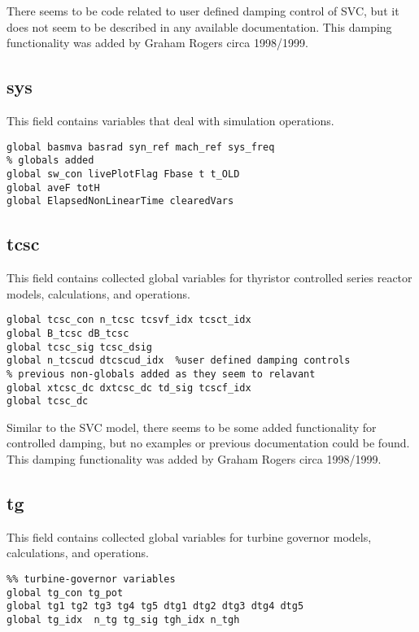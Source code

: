 There seems to be code related to user defined damping control of SVC, but it does not seem to be described in any available documentation. 
This damping functionality was added by Graham Rogers circa 1998/1999.


\subsection{sys}
This field contains variables that deal with simulation operations.
\begin{verbatim}
global basmva basrad syn_ref mach_ref sys_freq
% globals added
global sw_con livePlotFlag Fbase t t_OLD
global aveF totH
global ElapsedNonLinearTime clearedVars
\end{verbatim}

\subsection{tcsc}
This field contains collected global variables for thyristor controlled series reactor models, calculations, and operations.
\begin{verbatim}
global tcsc_con n_tcsc tcsvf_idx tcsct_idx
global B_tcsc dB_tcsc
global tcsc_sig tcsc_dsig
global n_tcscud dtcscud_idx  %user defined damping controls
% previous non-globals added as they seem to relavant
global xtcsc_dc dxtcsc_dc td_sig tcscf_idx 
global tcsc_dc
\end{verbatim}

Similar to the SVC model, there seems to be some added functionality for controlled damping, but no examples or previous documentation could be found.
This damping functionality was added by Graham Rogers circa 1998/1999.

\subsection{tg}
This field contains collected global variables for turbine governor models, calculations, and operations.
\begin{verbatim}
%% turbine-governor variables
global tg_con tg_pot
global tg1 tg2 tg3 tg4 tg5 dtg1 dtg2 dtg3 dtg4 dtg5
global tg_idx  n_tg tg_sig tgh_idx n_tgh
\end{verbatim}

